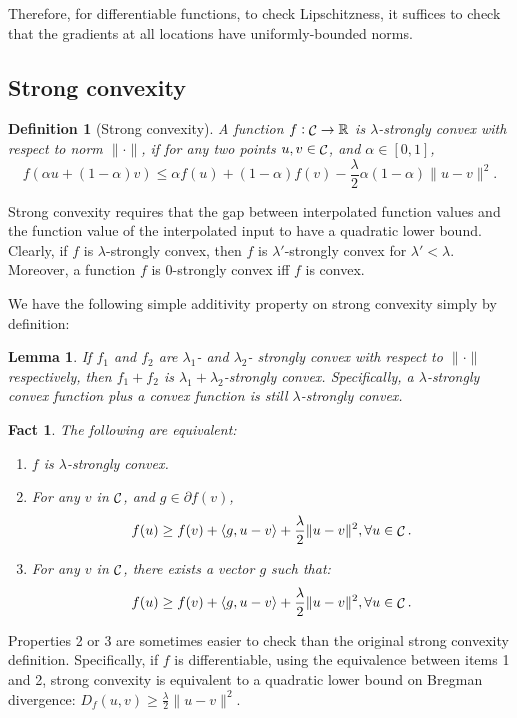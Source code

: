 \documentclass{article}
\newtheorem{lemma}{Lemma}
\newtheorem{definition}{Definition}
\newtheorem{fact}{Fact}
\DeclareMathOperator*{\Ccal}{{\cal C}}
\newcommand{\RR}{\mathbb{R}} %
\newcommand{\inner}[2]{\left\langle #1,#2 \right\rangle}
\begin{document}
Therefore, for differentiable functions, to check Lipschitzness, it suffices to check that the gradients at all locations have uniformly-bounded norms.

\subsection{Strong convexity}

\begin{definition}[Strong convexity]
A function $f: \Ccal \to \RR$ is $\lambda$-strongly convex with respect to norm $\| \cdot \|$, if for any two points
$u, v \in \Ccal$, and $\alpha \in [0,1]$,
\[ f(\alpha u + (1-\alpha)v) \leq \alpha f(u) + (1-\alpha) f(v) - \frac{\lambda}{2}\alpha(1-\alpha) \| u - v\|^2. \]
\end{definition}

Strong convexity requires that the gap between interpolated function values and the function value of the interpolated input to have a quadratic lower bound. Clearly, if $f$ is $\lambda$-strongly convex, then $f$ is $\lambda'$-strongly convex for $\lambda' < \lambda$. Moreover, a function $f$ is $0$-strongly convex iff $f$ is convex.

We have the following simple additivity property on strong convexity simply by definition:
\begin{lemma}
If $f_1$ and $f_2$ are $\lambda_1$- and $\lambda_2$- strongly convex with respect to $\| \cdot \|$ respectively, then $f_1 + f_2$ is $\lambda_1 + \lambda_2$-strongly convex. Specifically, a $\lambda$-strongly convex function plus a convex function is still $\lambda$-strongly convex.
\end{lemma}


\begin{fact}
The following are equivalent:
\begin{enumerate}
  \item $f$ is $\lambda$-strongly convex.
  \item For any $v$ in $\Ccal$, and $g \in \partial f(v)$,
  \[ f(u) \geq f(v) + \inner{g}{u - v} + \frac{\lambda}{2}\| u - v\|^2, \forall u \in \Ccal. \]
  \item For any $v$ in $\Ccal$, there exists a vector $g$ such that:
  \[ f(u) \geq f(v) + \inner{g}{u - v} + \frac{\lambda}{2}\| u - v\|^2, \forall u \in \Ccal. \]
\end{enumerate}
\end{fact}

Properties 2 or 3 are sometimes easier to check than the original strong convexity definition. Specifically, if $f$ is differentiable, using the equivalence between items 1 and 2, strong convexity is equivalent to a quadratic lower bound on Bregman divergence: $D_f(u, v) \geq \frac{\lambda}{2}\|u-v\|^2$.
\end{document}
